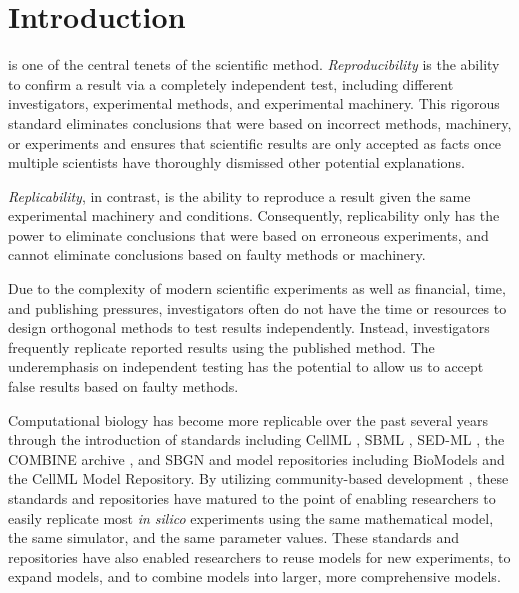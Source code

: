 \documentclass[journal,transmag,twoside]{IEEEtran}
\begin{document}
\section{Introduction}
% 
% 
% 
% 
 is one of the central tenets of the scientific method.
\textit{Reproducibility} is the ability to confirm a result via a completely independent test, including different investigators, experimental methods, and experimental machinery. 
This rigorous standard eliminates conclusions that were based on incorrect methods, machinery, or experiments and ensures that scientific results are only accepted as facts once multiple scientists have thoroughly dismissed other potential explanations. 

\textit{Replicability}, in contrast, is the ability to reproduce a result given the same experimental machinery and conditions. 
Consequently, replicability only has the power to eliminate conclusions that were based on erroneous experiments, and cannot eliminate conclusions based on faulty methods or machinery.

Due to the complexity of modern scientific experiments as well as financial, time, and publishing pressures, investigators often do not have the time or resources to design orthogonal methods to test results independently. Instead, investigators frequently replicate reported results using the published method. The underemphasis on independent testing has the potential to allow us to accept false results based on faulty methods.

Computational biology has become more replicable over the past several years through the introduction of standards including CellML \cite{cuellar2003overview}, SBML \cite{hucka2003}, SED-ML \cite{sedml2011}, the COMBINE archive \cite{COMBINE2012}, and SBGN \cite{LeNovereHMMSS09} and model repositories including BioModels and the CellML Model Repository.
By utilizing community-based development \cite{hucka2015promoting},
these standards and repositories have matured to the point of enabling researchers to easily replicate most
\textit{in silico} experiments using the same mathematical model, the same simulator, and the same parameter values. These standards and repositories have also enabled researchers to reuse models for new experiments, to expand models, and to combine models into larger, more comprehensive models.
\end{document}
